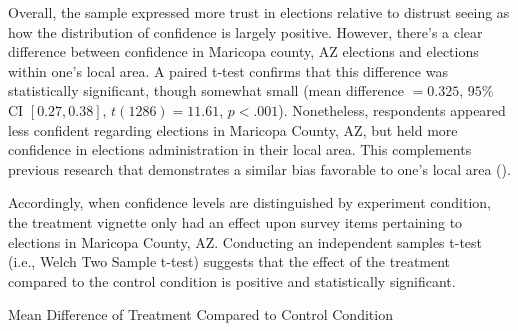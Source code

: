 \documentclass[
  12pt,
  letterpaper,
]{article}
\begin{document}
Overall, the sample expressed more trust in elections relative to
distrust seeing as how the distribution of confidence is largely
positive. However, there's a clear difference between confidence in
Maricopa county, AZ elections and elections within one's local area. A
paired t-test confirms that this difference was statistically
significant, though somewhat small (mean difference \(= 0.325\),
\(95\%\) CI \([0.27, 0.38]\), \(t(1286) = 11.61\), \(p < .001\)).
Nonetheless, respondents appeared less confident regarding elections in
Maricopa County, AZ, but held more confidence in elections
administration in their local area. This complements previous research
that demonstrates a similar bias favorable to one's local area
().

Accordingly, when confidence levels are distinguished by experiment
condition, the treatment vignette only had an effect upon survey items
pertaining to elections in Maricopa County, AZ. Conducting an
independent samples t-test (i.e., Welch Two Sample t-test) suggests that
the effect of the treatment compared to the control condition is
positive and statistically significant.

\begin{table}[H]

\caption{\label{tbl-ttest}Mean Difference of Treatment Compared to
Control Condition}


\end{table}%
\end{document}
